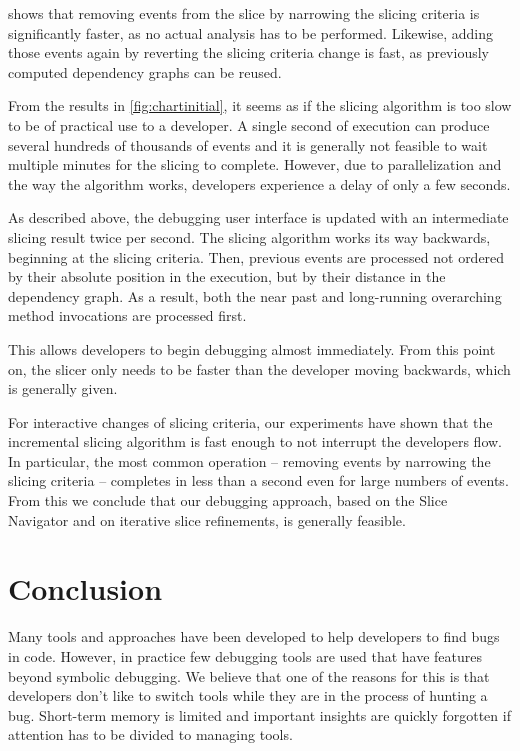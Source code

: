 ﻿\documentclass[
      english,
			conference,
      ]{IEEEtran}
\begin{document}
 shows that removing events from the slice by narrowing the slicing criteria is significantly faster, as no actual analysis has to be performed.
Likewise, adding those events again by reverting the slicing criteria change is fast, as previously computed dependency graphs can be reused.

\medskip

From the results in \cref{fig:chartinitial}, it seems as if the slicing algorithm is too slow to be of practical use to a developer.
A single second of execution can produce several hundreds of thousands of events and it is generally not feasible to wait multiple minutes for the slicing to complete.
However, due to parallelization and the way the algorithm works, developers experience a delay of only a few seconds.

As described above, the debugging user interface is updated with an intermediate slicing result twice per second.
The slicing algorithm works its way backwards, beginning at the slicing criteria.
Then, previous events are processed not ordered by their absolute position in the execution, but by their distance in the dependency graph.
As a result, both the near past and long-running overarching method invocations are processed first.

This allows developers to begin debugging almost immediately. 
From this point on, the slicer only needs to be faster than the developer moving backwards, which is generally given.

For interactive changes of slicing criteria, our experiments have shown that the incremental slicing algorithm is fast enough to not interrupt the developers flow.
In particular, the most common operation -- removing events by narrowing the slicing criteria -- completes in less than a second even for large numbers of events.
From this we conclude that our debugging approach, based on the Slice Navigator and on iterative slice refinements, is generally feasible.

\section{Conclusion}
\label{sec:conclusion}

Many tools and approaches have been developed to help developers to find bugs in code.
However, in practice few debugging tools are used that have features beyond symbolic debugging.
We believe that one of the reasons for this is that developers don't like to switch tools while they are in the process of hunting a bug.
Short-term memory is limited and important insights are quickly forgotten if attention has to be divided to managing tools.
\end{document}
